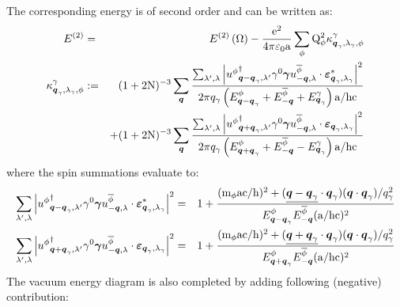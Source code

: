 \documentclass[10pt,a4paper,twoside,openany]{book}
\begin{document}
The corresponding energy is of second order and can be written as:
\begin{eqnarray*}
E^{(2)} & = & E^{(2)} \left( \Omega \right) - \frac{\mathrm e^2}{4 \pi \mathrm \varepsilon_0 \mathrm a} \sum_{\phi} \mathrm Q_{\phi}^2 \kappa^{\gamma}_{\boldsymbol{q}_\gamma,\lambda_\gamma,\phi} \\
\kappa^{\gamma}_{\boldsymbol{q}_\gamma,\lambda_\gamma,\phi} & := & ( 1 + 2 \mathrm N )^{-3} \sum_{\boldsymbol{q}} \frac {\sum_{\lambda',\lambda} \left| {u^{\phi}}^{\dagger}_{{\boldsymbol{q} - \boldsymbol{q}_\gamma}, {\lambda'}} \gamma^{0} \boldsymbol{\gamma} u^{\overline{\phi}}_{{-\boldsymbol{q}}, {\lambda}} \cdot \boldsymbol{\varepsilon}_{{\boldsymbol{q}_\gamma},{\lambda_\gamma}}^* \right|^2} {2 \pi q_\gamma \left( E^{\phi}_{\boldsymbol{q} - \boldsymbol{q}_\gamma} + E^{\overline{\phi}}_{-\boldsymbol{q}} + E^{\gamma}_{\boldsymbol{q}_\gamma} \right) \mathrm a / \mathrm h \mathrm c} \\
&& + ( 1 + 2 \mathrm N )^{-3} \sum_{\boldsymbol{q}} \frac {\sum_{\lambda',\lambda} \left| {u^{\phi}}^{\dagger}_{{\boldsymbol{q} + \boldsymbol{q}_\gamma}, {\lambda'}} \gamma^{0} \boldsymbol{\gamma} u^{\overline{\phi}}_{{-\boldsymbol{q}}, {\lambda}} \cdot \boldsymbol{\varepsilon}_{{\boldsymbol{q}_\gamma},{\lambda_\gamma}} \right|^2} {2 \pi q_\gamma \left( E^{\phi}_{\boldsymbol{q} + \boldsymbol{q}_\gamma} + E^{\overline{\phi}}_{-\boldsymbol{q}} - E^{\gamma}_{\boldsymbol{q}_\gamma} \right) \mathrm a / \mathrm h \mathrm c}
\end{eqnarray*}
where the spin summations evaluate to:
\begin{eqnarray*}
\sum_{\lambda',\lambda} \left| {u^{\phi}}^{\dagger}_{{\boldsymbol{q} - \boldsymbol{q}_\gamma}, {\lambda'}} \gamma^{0} \boldsymbol{\gamma} u^{\overline{\phi}}_{{-\boldsymbol{q}}, {\lambda}} \cdot \boldsymbol{\varepsilon}_{{\boldsymbol{q}_\gamma},{\lambda_\gamma}}^* \right|^2 & = & 1 + \frac{( \mathrm m_{\phi} \mathrm a \mathrm c / \mathrm h )^2 + ( \underline{\boldsymbol{q} - \boldsymbol{q}_\gamma} \cdot \boldsymbol{q}_\gamma ) ( \boldsymbol{q} \cdot \boldsymbol{q}_\gamma ) / q_\gamma^2}{E^{\phi}_{\boldsymbol{q} - \boldsymbol{q}_\gamma} E^{\overline{\phi}}_{-\boldsymbol{q}} ( \mathrm a / \mathrm h \mathrm c )^2} \\
\sum_{\lambda',\lambda} \left| {u^{\phi}}^{\dagger}_{{\boldsymbol{q} + \boldsymbol{q}_\gamma}, {\lambda'}} \gamma^{0} \boldsymbol{\gamma} u^{\overline{\phi}}_{{-\boldsymbol{q}}, {\lambda}} \cdot \boldsymbol{\varepsilon}_{{\boldsymbol{q}_\gamma},{\lambda_\gamma}} \right|^2 & = & 1 + \frac{( \mathrm m_{\phi} \mathrm a \mathrm c / \mathrm h )^2 + ( \underline{\boldsymbol{q} + \boldsymbol{q}_\gamma} \cdot \boldsymbol{q}_\gamma ) ( \boldsymbol{q} \cdot \boldsymbol{q}_\gamma ) / q_\gamma^2}{E^{\phi}_{\boldsymbol{q} + \boldsymbol{q}_\gamma} E^{\overline{\phi}}_{-\boldsymbol{q}} ( \mathrm a / \mathrm h \mathrm c )^2}
\end{eqnarray*}
The vacuum energy diagram is also completed by adding following (negative) contribution:
\end{document}
